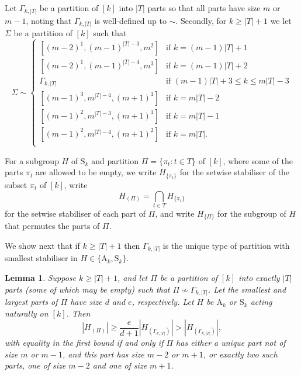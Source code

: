\documentclass[twoside,a4paper,reqno,11pt]{amsart}
\newcommand{\<}{\langle}
\renewcommand{\>}{\rangle}
\newcommand{\leqs}{\leqslant}
\newcommand{\geqs}{\geqslant}
\def\ge{\geqs}
\newcommand{\Sn}{\mathrm{S}}
\newcommand{\An}{\mathrm{A}}
\newcommand{\minPart}{\Gamma_{k, |T|}}
\newtheorem{lem}[thm]{Lemma}
\theoremstyle{definition}
\begin{document}
Let 
$\minPart$
be a partition of $[k]$ into $|T|$ parts so that all parts have size $m$ or $m-1$,
noting that  $\minPart$ is well-defined up to $\sim$. 
Secondly,  for $k \geqs |T|+1$ we let $\Sigma$ be a partition of $[k]$ such that
\begin{equation}\label{eq:sigma}
\Sigma\sim
\begin{cases}
[(m-2)^1,(m-1)^{|T|-3},m^2] & \mbox{if $k = (m-1)|T|+1$}\\
[(m-2)^1,(m-1)^{|T|-4},m^3] & \mbox{if $k = (m-1)|T|+2$}\\
\minPart & \mbox{if $(m-1)|T|+3\leqs k\leqs m|T|-3$}\\
[(m-1)^3,m^{|T|-4},(m+1)^1] & \mbox{if $k = m|T|-2$}\\
[(m-1)^2,m^{|T|-3},(m+1)^1] & \mbox{if $k = m|T|-1$}\\
[(m-1)^2,m^{|T|-4},(m+1)^2] & \mbox{if $k = m|T|$.}\\
\end{cases}
\end{equation}

For a subgroup $H$ of $\Sn_k$ and partition $\Pi = \{\pi_t : t \in T\}$ of $[k]$, where some of the parts $\pi_t$ are allowed to be empty, we write $H_{\{\pi_t\}}$ for the setwise stabiliser of the subset $\pi_t$ of $[k]$, %
write
\begin{equation*}
H_{(\Pi)} = \bigcap_{t \in T} H_{\{\pi_t\}}
\end{equation*}
for the setwise stabiliser of each part of $\Pi$, and write $H_{\{\Pi\}}$ for the subgroup of $H$ that permutes the parts of $\Pi$.  


We show next that if $k \ge |T| + 1$ then $\minPart$ is the unique type of partition with smallest stabiliser in $H \in \{\An_k, \Sn_k\}$.

\begin{lem}\label{l:min_part}
Suppose $k \ge |T| + 1$, and let $\Pi$ be a partition of $[k]$ into exactly $|T|$ %
parts (some of which may be empty) such that $\Pi \not\sim \minPart$. Let the smallest and largest parts of $\Pi$ have size $d$ and $e$, respectively. Let $H$ be $\An_k$ or $\Sn_k$ acting naturally on $[k]$. Then \[|H_{(\Pi)}| \geqs \frac{e}{d+1}|H_{(\minPart)}| >|H_{(\minPart)}|,\] with equality in the first bound %
if and only if $\Pi$ has either a unique part not of size $m$ or $m-1$, and this part has size $m-2$ or $m+1$, or exactly two such parts, one of size $m-2$ and one of size $m+1$. 
\end{lem}
\end{document}
